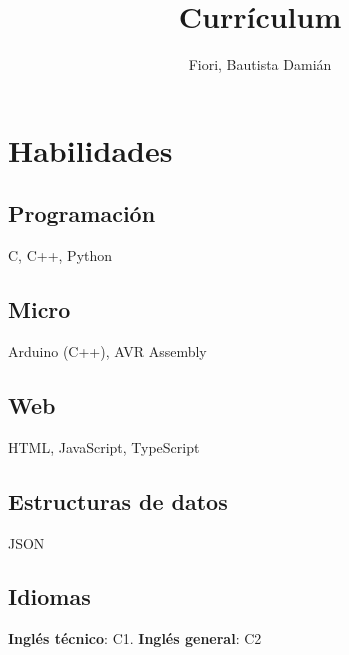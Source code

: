 \documentclass[a4paper]{article}
\begin{document}
\title{Currículum}
\author{Fiori, Bautista Damián}
\maketitle
\section{Habilidades}
\subsection{Programación}
C, C++, Python
\subsection{Micro}
Arduino (C++), AVR Assembly
\subsection{Web}
HTML, JavaScript, TypeScript
\subsection{Estructuras de datos}
JSON
\subsection{Idiomas}
\textbf{Inglés técnico}: C1. \textbf{Inglés general}: C2
\end{document}
